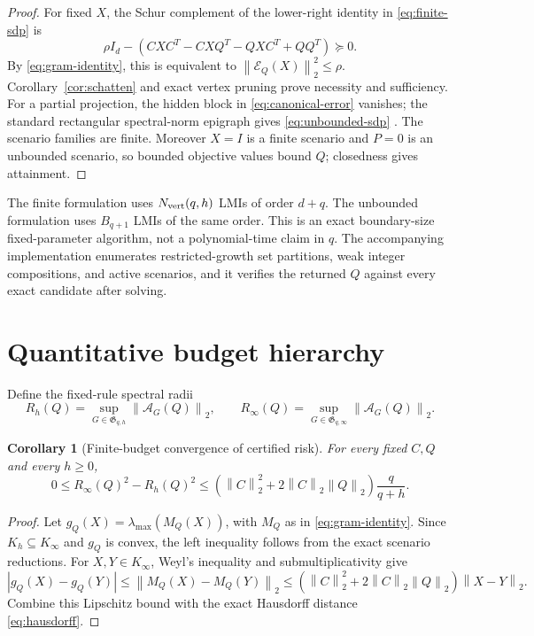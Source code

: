 \documentclass[11pt]{article}
\newtheorem{corollary}[theorem]{Corollary}
\theoremstyle{definition}
\theoremstyle{remark}
\newcommand{\cE}{\mathcal E}
\newcommand{\cA}{\mathcal A}
\newcommand{\fG}{\mathfrak G}
\newcommand{\norm}[1]{\left\lVert #1\right\rVert}
\begin{document}
\begin{proof}
For fixed $X$, the Schur complement of the lower-right identity in
\eqref{eq:finite-sdp} is
\[
  \rho I_d-
  \left(CXC^T-CXQ^T-QXC^T+QQ^T\right)\succeq0.
\]
By \eqref{eq:gram-identity}, this is equivalent to
$\norm{\cE_Q(X)}_2^2\leq\rho$.  Corollary~\ref{cor:schatten} and exact vertex
pruning prove necessity and sufficiency.  For a partial projection, the
hidden block in \eqref{eq:canonical-error} vanishes; the standard rectangular
spectral-norm epigraph gives \eqref{eq:unbounded-sdp}
\cite{boyd2004}.  The scenario families
are finite.  Moreover $X=I$ is a finite scenario and $P=0$ is an unbounded
scenario, so bounded objective values bound $Q$; closedness gives attainment.
\end{proof}

The finite formulation uses $N_{\rm vert}(q,h)$ LMIs of order $d+q$.  The
unbounded formulation uses $B_{q+1}$ LMIs of the same order.  This is an exact
boundary-size fixed-parameter algorithm, not a polynomial-time claim in $q$.
The accompanying implementation enumerates restricted-growth set partitions,
weak integer compositions, and active scenarios, and it verifies the returned
$Q$ against every exact candidate after solving.

\section{Quantitative budget hierarchy}

Define the fixed-rule spectral radii
\[
  R_h(Q)=\sup_{G\in\fG_{q,h}}\norm{\cA_G(Q)}_2,
  \qquad
  R_\infty(Q)=\sup_{G\in\fG_{q,\infty}}\norm{\cA_G(Q)}_2.
\]

\begin{corollary}[Finite-budget convergence of certified risk]
\label{cor:rate}
For every fixed $C,Q$ and every $h\geq0$,
\begin{equation}
  0\leq R_\infty(Q)^2-R_h(Q)^2
  \leq
  \left(\norm{C}_2^2+2\norm{C}_2\norm{Q}_2\right)
  \frac{q}{q+h}.
  \label{eq:risk-rate}
\end{equation}
\end{corollary}

\begin{proof}
Let $g_Q(X)=\lambda_{\max}(M_Q(X))$, with $M_Q$ as in
\eqref{eq:gram-identity}.  Since $K_h\subseteq K_\infty$ and $g_Q$ is convex,
the left inequality follows from the exact scenario reductions.  For
$X,Y\in K_\infty$, Weyl's inequality and submultiplicativity give
\[
 |g_Q(X)-g_Q(Y)|
 \leq\norm{M_Q(X)-M_Q(Y)}_2
 \leq(\norm{C}_2^2+2\norm{C}_2\norm{Q}_2)\norm{X-Y}_2.
\]
Combine this Lipschitz bound with the exact Hausdorff distance
\eqref{eq:hausdorff}.
\end{proof}
\end{document}
